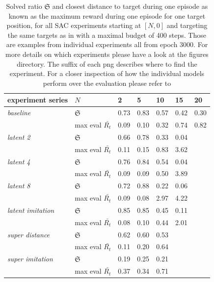 \begin{table}
    \begin{center}
        \begin{tabular}{ l l | l l l l l}
        experiment series           & $N$                   & 2    & 5    & 10   & 15   & 20   \\
        \hline
        \hline
        \textit{baseline}           & $\mathfrak{S}$        & 0.73 & 0.83 & 0.57 & 0.42 & 0.30 \\
                                    & max eval $\bar{R_t}$  & 0.09 & 0.10 & 0.32 & 0.74 & 0.82 \\
        \hline
        \textit{latent 2}           & $\mathfrak{S}$        & 0.66 & 0.78 & 0.33 & 0.04 &      \\
                                    & max eval $\bar{R_t}$  & 0.11 & 0.15 & 0.83 & 3.62 &      \\
        \hline
        \textit{latent 4}           & $\mathfrak{S}$        & 0.76 & 0.84 & 0.54 & 0.04 &      \\
                                    & max eval $\bar{R_t}$  & 0.09 & 0.09 & 0.50 & 3.89 &      \\
        \hline
        \textit{latent 8}           & $\mathfrak{S}$        & 0.72 & 0.88 & 0.22 & 0.06 &      \\
                                    & max eval $\bar{R_t}$  & 0.09 & 0.08 & 2.97 & 4.22 &      \\
        \hline
        \textit{latent imitation}   & $\mathfrak{S}$        & 0.85 & 0.85 & 0.45 & 0.11 &      \\
                                    & max eval $\bar{R_t}$  & 0.08 & 0.10 & 0.44 & 2.01 &      \\
        \hline
        \textit{super distance}     & $\mathfrak{S}$        & 0.62 & 0.60 & 0.53 &      &      \\
                                    & max eval $\bar{R_t}$  & 0.11 & 0.20 & 0.64 &      &      \\
        \hline
        \textit{super imitation}    & $\mathfrak{S}$        & 0.19 & 0.25 & 0.21 &      &      \\
                                    & max eval $\bar{R_t}$  & 0.37 & 0.34 & 0.71 &      &      \\
    \end{tabular}
    \end{center}
    \caption[SAC Solved ratio]{Solved ratio $\mathfrak{S}$ and closest distance to target during one episode as known as the maximum reward during one episode for one target position, for all SAC experiments starting at $[N, 0]$ and targeting the same targets as in  with a maximal budget of 400 steps. Those are examples from individual experiments all from epoch 3000. For more details on which experiments please have a look at the figures directory. The suffix of each png describes where to find the experiment. For a closer inspection of how the individual models perform over the evaluation please refer to }
    \label{tab:SAC_solved_ratio}
\end{table}

